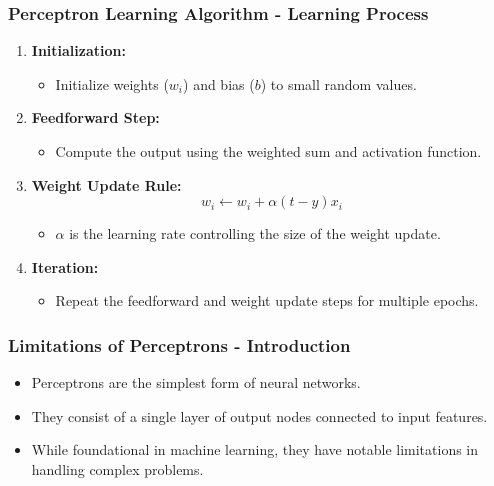 \documentclass[aspectratio=169]{beamer}
\begin{document}
\begin{frame}[fragile]
    \frametitle{Perceptron Learning Algorithm - Learning Process}
    \begin{enumerate}
        \item \textbf{Initialization:}
        \begin{itemize}
            \item Initialize weights (\(w_i\)) and bias (\(b\)) to small random values.
        \end{itemize}
        
        \item \textbf{Feedforward Step:}
        \begin{itemize}
            \item Compute the output using the weighted sum and activation function.
        \end{itemize}

        \item \textbf{Weight Update Rule:}
        \begin{equation}
            w_i \leftarrow w_i + \alpha (t - y) x_i
        \end{equation}
        \begin{itemize}
            \item \(\alpha\) is the learning rate controlling the size of the weight update.
        \end{itemize}

        \item \textbf{Iteration:}
        \begin{itemize}
            \item Repeat the feedforward and weight update steps for multiple epochs.
        \end{itemize}
    \end{enumerate}
\end{frame}

\begin{frame}[fragile]
    \frametitle{Limitations of Perceptrons - Introduction}
    \begin{itemize}
        \item Perceptrons are the simplest form of neural networks.
        \item They consist of a single layer of output nodes connected to input features.
        \item While foundational in machine learning, they have notable limitations in handling complex problems.
    \end{itemize}
\end{frame}
\end{document}
